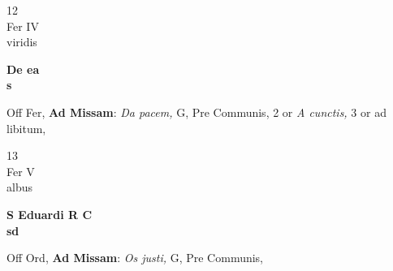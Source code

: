 \documentclass[10pt, openany]{book}
\begin{document}
        \begin{center}
            \begin{minipage}{3.5in}
                \vspace{2em}
                \begin{minipage}{0.5in}
                    {\Huge 12} \\
                    {\normalsize Fer IV} \\
                    {\normalsize viridis}
                \end{minipage}
                \begin{minipage}{3.0in}
                    \textbf{ \large De ea \\
                    \textnormal{\normalsize s}} \\ 
                \end{minipage}
                \begin{justify}Off Fer, \textbf{Ad Missam}: \textit{Da pacem,} G, Pre Communis, 2 or \textit{A cunctis,} 3 or ad libitum,   
                \end{justify}
            \end{minipage}
        \end{center}
    
        \begin{center}
            \begin{minipage}{3.5in}
                \vspace{2em}
                \begin{minipage}{0.5in}
                    {\Huge 13} \\
                    {\normalsize Fer V} \\
                    {\normalsize albus}
                \end{minipage}
                \begin{minipage}{3.0in}
                    \textbf{ \large S Eduardi R C \\
                    \textnormal{\normalsize sd}} \\ 
                \end{minipage}
                \begin{justify}Off Ord, \textbf{Ad Missam}: \textit{Os justi,} G, Pre Communis,   
                \end{justify}
            \end{minipage}
        \end{center}
    
\end{document}
